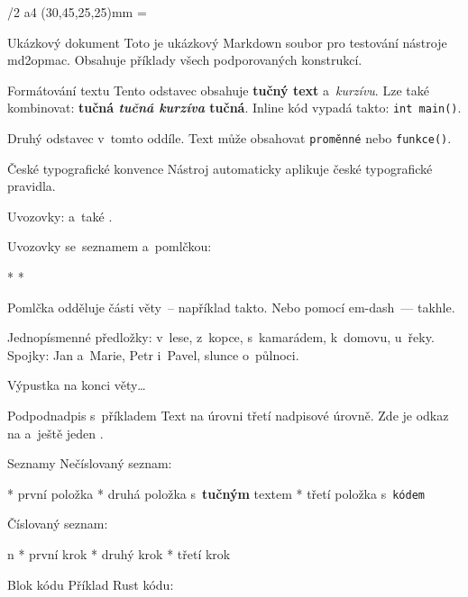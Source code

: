 \fontfam[LM]
\def\begcitation{\par\medskip\leftskip=2em\rightskip=2em\noindent}
\def\endcitation{\par\leftskip=0em\rightskip=0em\medskip}
\fontfam[Termes]
\typosize[11/13]
\margins/2 a4 (30,45,25,25)mm
\footline={\hss\folio\hss}



\chap Ukázkový dokument
Toto je ukázkový Markdown soubor pro testování nástroje md2opmac.
Obsahuje příklady všech podporovaných konstrukcí.


\sec Formátování textu
Tento odstavec obsahuje {\bf tučný text} a~{\it kurzívu}. Lze také kombinovat:
{\bf tučná {\it tučná kurzíva} tučná}. Inline kód vypadá takto: {\tt int main()}.

Druhý odstavec v~tomto oddíle. Text může obsahovat {\tt proměnné} nebo {\tt funkce()}.


\sec České typografické konvence
Nástroj automaticky aplikuje české typografické pravidla.

Uvozovky:  a~také .

Uvozovky se~seznamem a~pomlčkou:

\begitems
* 
* 
\enditems

Pomlčka odděluje části věty~-- například takto. Nebo pomocí em-dash~--- takhle.

Jednopísmenné předložky: v~lese, z~kopce, s~kamarádem, k~domovu, u~řeky.
Spojky: Jan a~Marie, Petr i~Pavel, slunce o~půlnoci.

Výpustka na konci věty\dots{}


\secc Podpodnadpis s~příkladem
Text na úrovni třetí nadpisové úrovně. Zde je odkaz na
 a~ještě jeden
.


\sec Seznamy
Nečíslovaný seznam:

\begitems
* první položka
* druhá položka s~{\bf tučným} textem
* třetí položka s~{\tt kódem}
\enditems

Číslovaný seznam:

\begitems \style n
* první krok
* druhý krok
* třetí krok
\enditems


\sec Blok kódu
Příklad Rust kódu:

